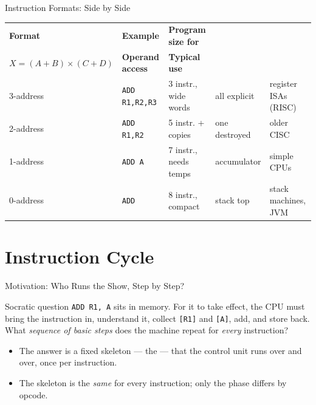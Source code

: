 \documentclass[aspectratio=169]{beamer}
\begin{document}
\begin{frame}{Instruction Formats: Side by Side}
  \footnotesize
  \setlength{\tabcolsep}{4pt}
  \begin{tabular}{@{}p{1.8cm}p{2.4cm}p{3.4cm}p{2.2cm}p{2.4cm}@{}}
    \toprule
    \textbf{Format} & \textbf{Example} & \textbf{Program size for} \\[-1pt]
    $X=(A{+}B)\times(C{+}D)$ & \textbf{Operand access} & \textbf{Typical use} \\
    \midrule
    3-address & \texttt{ADD R1,R2,R3} & 3 instr., wide words & all explicit & register ISAs (RISC) \\
    2-address & \texttt{ADD R1,R2}    & 5 instr. + copies     & one destroyed      & older CISC \\
    1-address & \texttt{ADD A}        & 7 instr., needs temps & accumulator        & simple CPUs \\
    0-address & \texttt{ADD}          & 8 instr., compact    & stack top          & stack machines, JVM \\
    \bottomrule
  \end{tabular}
  \vspace{0.3cm}
  \begin{center}
  \end{center}
\end{frame}

\section{Instruction Cycle}


\begin{frame}{Motivation: Who Runs the Show, Step by Step?}
  \begin{block}{Socratic question}
    \texttt{ADD R1, A} sits in memory. For it to take effect, the CPU must bring
    the instruction in, understand it, collect \texttt{[R1]} and \texttt{[A]},
    add, and store back. What \emph{sequence of basic steps} does the machine
    repeat for \emph{every} instruction?
  \end{block}
  \begin{itemize}
    \item The answer is a fixed skeleton --- the  --- that
      the control unit runs over and over, once per instruction.
    \item The skeleton is the \emph{same} for every instruction; only the
       phase differs by opcode.
  \end{itemize}
\end{frame}
\end{document}
